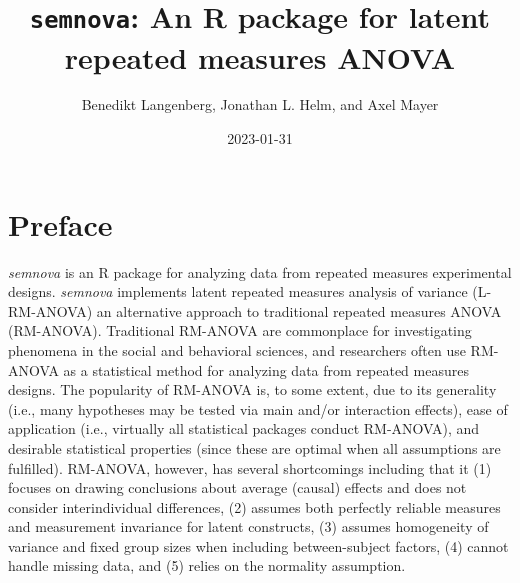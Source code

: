 \documentclass[
]{book}
\title{\texttt{semnova}: An R package for latent repeated measures ANOVA}
\author{Benedikt Langenberg, Jonathan L. Helm, and Axel Mayer}
\date{2023-01-31}
\begin{document}
\maketitle

{
\setcounter{tocdepth}{1}
\tableofcontents
}
\hypertarget{preface}{%
\chapter*{Preface}\label{preface}}

\emph{semnova} is an R package for analyzing data from repeated measures experimental designs. \emph{semnova} implements latent repeated measures analysis of variance (L-RM-ANOVA) an alternative approach to traditional repeated measures ANOVA (RM-ANOVA). Traditional RM-ANOVA are commonplace for investigating phenomena in the social and behavioral sciences, and researchers often use RM-ANOVA as a statistical method for analyzing data from repeated measures designs. The popularity of RM-ANOVA is, to some extent, due to its generality (i.e., many hypotheses may be tested via main and/or interaction effects), ease of application (i.e., virtually all statistical packages conduct RM-ANOVA), and desirable statistical properties (since these are optimal when all assumptions are fulfilled). RM-ANOVA, however, has several shortcomings including that it (1) focuses on drawing conclusions about average (causal) effects and does not consider interindividual differences, (2) assumes both perfectly reliable measures and measurement invariance for latent constructs, (3) assumes homogeneity of variance and fixed group sizes when including between-subject factors, (4) cannot handle missing data, and (5) relies on the normality assumption.
\end{document}
